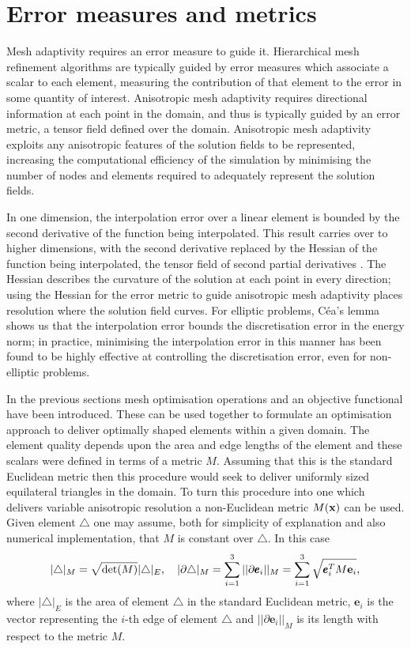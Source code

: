 \chapter{Error measures and metrics}
Mesh adaptivity requires an error measure to guide it. Hierarchical
mesh refinement algorithms are typically guided by error measures
which associate a scalar to each element, measuring the contribution
of that element to the error in some quantity of interest. Anisotropic
mesh adaptivity \citep{simpson1994, buscaglia1997, pain2001, li2005,
  frey2005} requires directional information at each point in the
domain, and thus is typically guided by an error metric, a tensor
field defined over the domain.  Anisotropic mesh adaptivity exploits
any anisotropic features of the solution fields to be represented,
increasing the computational efficiency of the simulation by
minimising the number of nodes and elements required to adequately
represent the solution fields.

In one dimension, the interpolation error over a linear element is
bounded by the second derivative of the function being
interpolated. This result carries over to higher dimensions, with the
second derivative replaced by the Hessian of the function being
interpolated, the tensor field of second partial derivatives
\citep{frey2005}. The Hessian describes the curvature of the solution
at each point in every direction; using the Hessian for the error
metric to guide anisotropic mesh adaptivity places resolution where
the solution field curves. For elliptic problems, C\'ea's lemma shows
us that the interpolation error bounds the discretisation error in the
energy norm; in practice, minimising the interpolation error in this
manner has been found to be highly effective at controlling the
discretisation error, even for non-elliptic problems.

In the previous sections mesh optimisation operations and an objective
functional have been introduced.  These can be used together to
formulate an optimisation approach to deliver optimally shaped
elements within a given domain. The element quality depends upon the
area and edge lengths of the element and these scalars were defined in
terms of a metric $M$. Assuming that this is the standard Euclidean
metric then this procedure would seek to deliver uniformly sized
equilateral triangles in the domain. To turn this procedure into one
which delivers variable anisotropic resolution a non-Euclidean metric
$M({\bf x})$ can be used. Given element $\triangle$ one may assume,
both for simplicity of explanation and also numerical implementation,
that $M$ is constant over $\triangle$. In this case
\begin{equation*}
|\triangle|_M = \sqrt{\textrm{det}(M)}|\triangle|_E,\quad
|\partial \triangle|_M = \sum_{i=1}^{3} ||\partial \pmb{e}_i||_M = \sum_{i=1}^{3} \sqrt{\pmb{e}_i^T M {\bf e}_i},
\end{equation*}
where $|\triangle|_E$ is the area of element $\triangle$ in the
standard Euclidean metric, $\pmb{e}_i$ is the vector representing the
$i$-th edge of element $\triangle$ and $||\partial \pmb{e}_i||_M$ is
its length with respect to the metric $M$.


